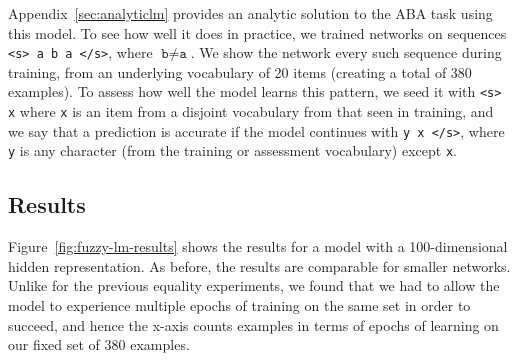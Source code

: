 \documentclass[9pt,twocolumn,twoside,lineno]{pnas-new}
\newcommand{\Figref}[1]{Figure~\ref{#1}}
\newcommand{\Appref}[1]{Appendix~\ref{#1}}
\begin{document}
\Appref{sec:analyticlm} provides an analytic solution to the ABA task using this model.  To see how well it does in practice, we trained networks on sequences \texttt{<s> a b a </s>}, where $\texttt{b} \neq \texttt{a}$. We show the network every such sequence during training, from an underlying vocabulary of 20 items (creating a total of 380 examples). To assess how well the model learns this pattern, we seed it with \texttt{<s> x} where \texttt{x} is an item from a disjoint vocabulary from that seen in training, and we say that a prediction is accurate if the model continues with \texttt{y x </s>}, where \texttt{y} is any character (from the training or assessment vocabulary) except \texttt{x}.


\subsection*{Results}

\Figref{fig:fuzzy-lm-results} shows the results for a model with a 100-dimensional hidden representation. As before, the results are comparable for smaller networks. Unlike for the previous equality experiments, we found that we had to allow the model to experience multiple epochs of training on the same set in order to succeed, and hence the x-axis counts examples in terms of epochs of learning on our fixed set of 380 examples.
\end{document}
